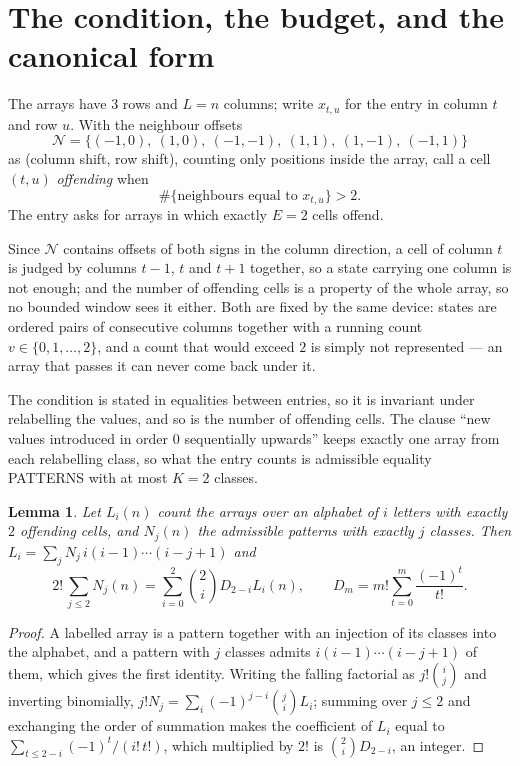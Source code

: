 \documentclass[11pt,a4paper]{article}
\theoremstyle{plain}
\newtheorem{lemma}[theorem]{Lemma}
\theoremstyle{definition}
\begin{document}
\section{The condition, the budget, and the canonical form}

The arrays have $3$ rows and $L=n$ columns; write $x_{t,u}$ for the entry in
column $t$ and row $u$. With the neighbour offsets
\[
\mathcal N=\{(-1,0),\ (1,0),\ (-1,-1),\ (1,1),\ (1,-1),\ (-1,1)\}
\]
as (column shift, row shift), counting only positions inside the array, call a cell
$(t,u)$ \emph{offending} when
\[
\#\{\text{neighbours equal to }x_{t,u}\}>2 .
\]
The entry asks for arrays in which exactly $E=2$ cells offend.

Since $\mathcal N$ contains offsets of both signs in the column direction, a cell of column
$t$ is judged by columns $t-1$, $t$ and $t+1$ together, so a state carrying one column is not
enough; and the number of offending cells is a property of the whole array, so no bounded
window sees it either. Both are fixed by the same device: states are ordered pairs of
consecutive columns together with a running count $v\in\{0,1,\dots,2\}$, and a count that
would exceed $2$ is simply not represented --- an array that passes it can never come back
under it.

The condition is stated in equalities between entries, so it is invariant under relabelling
the values, and so is the number of offending cells. The clause ``new values introduced in
order $0$ sequentially upwards'' keeps exactly one array from each relabelling class, so what
the entry counts is admissible equality PATTERNS with at most $K=2$ classes.

\begin{lemma}\label{lem:inv}
Let $L_i(n)$ count the arrays over an alphabet of $i$ letters with exactly $2$ offending
cells, and $N_j(n)$ the admissible patterns with exactly $j$ classes. Then
$L_i=\sum_j N_j\,i(i-1)\cdots(i-j+1)$ and
\[
2!\,\sum_{j\le2}N_j(n)=\sum_{i=0}^{2}\binom{2}{i}D_{2-i}L_i(n),
\qquad D_m=m!\sum_{t=0}^{m}\frac{(-1)^t}{t!} .
\]
\end{lemma}

\begin{proof}
A labelled array is a pattern together with an injection of its classes into the alphabet,
and a pattern with $j$ classes admits $i(i-1)\cdots(i-j+1)$ of them, which gives the first
identity. Writing the falling factorial as $j!\binom{i}{j}$ and inverting binomially,
$j!N_j=\sum_i(-1)^{j-i}\binom{j}{i}L_i$; summing over $j\le2$ and exchanging the
order of summation makes the coefficient of $L_i$ equal to
$\sum_{t\le2-i}(-1)^t/(i!\,t!)$, which multiplied by $2!$ is
$\binom{2}{i}D_{2-i}$, an integer.
\end{proof}
\end{document}
